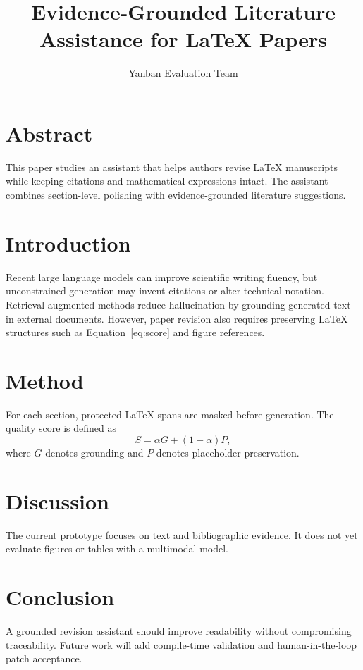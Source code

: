 \documentclass{article}
\title{Evidence-Grounded Literature Assistance for LaTeX Papers}
\author{Yanban Evaluation Team}
\begin{document}
\maketitle

\section{Abstract}
This paper studies an assistant that helps authors revise LaTeX manuscripts while keeping citations and mathematical expressions intact. The assistant combines section-level polishing with evidence-grounded literature suggestions.

\section{Introduction}
Recent large language models can improve scientific writing fluency, but unconstrained generation may invent citations or alter technical notation. Retrieval-augmented methods reduce hallucination by grounding generated text in external documents\cite{lewis2020rag}. However, paper revision also requires preserving LaTeX structures such as Equation~\ref{eq:score} and figure references.

\section{Method}
For each section, protected LaTeX spans are masked before generation. The quality score is defined as
\begin{equation}
S = \alpha G + (1-\alpha) P,
\label{eq:score}
\end{equation}
where $G$ denotes grounding and $P$ denotes placeholder preservation.

\section{Discussion}
The current prototype focuses on text and bibliographic evidence. It does not yet evaluate figures or tables with a multimodal model.

\section{Conclusion}
A grounded revision assistant should improve readability without compromising traceability. Future work will add compile-time validation and human-in-the-loop patch acceptance.



\end{document}
